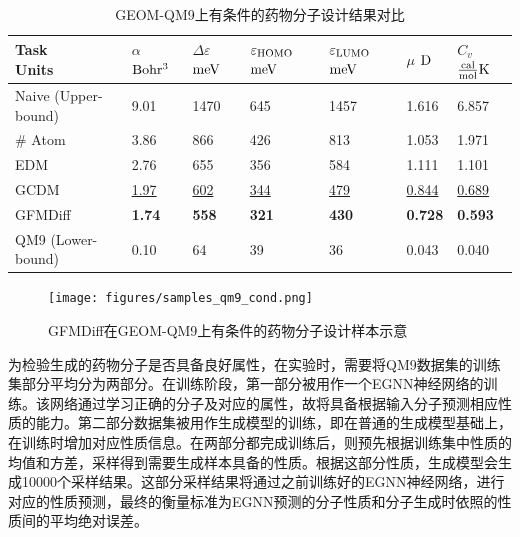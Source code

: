 \begin{table}[h]
    \centering
    \caption{GEOM-QM9上有条件的药物分子设计结果对比}
    \label{tab:gen_qm9_condition}
    \begin{tabular}{lllllll}
    \toprule
    \makecell[l]{Task\\Units} & \makecell[l]{$\alpha$\\${\rm Bohr^3}$} & \makecell[l]{$\Delta \varepsilon$\\${\rm meV}$} & \makecell[l]{$\varepsilon_{{\rm HOMO}}$\\${\rm meV}$} & \makecell[l]{$\varepsilon_{{\rm LUMO}}$\\${\rm meV}$} & \makecell[l]{$\mu$\\${\rm D}$} & \makecell[l]{$C_v$\\$\frac{{\rm cal}}{{\rm mol}}{\rm K}$} \\
    \midrule
    Naive (Upper-bound) & 9.01 & 1470 & 645 & 1457 & 1.616 & 6.857 \\
    \# Atom & 3.86 & 866 & 426 & 813 & 1.053 & 1.971 \\
    EDM & 2.76 & 655 & 356 & 584 & 1.111 & 1.101 \\
    GCDM & \underline{1.97} & \underline{602} & \underline{344} & \underline{479} & \underline{0.844} & \underline{0.689} \\
    GFMDiff & \textbf{1.74} & \textbf{558} & \textbf{321} & \textbf{430} & \textbf{0.728} & \textbf{0.593} \\
    QM9 (Lower-bound) & 0.10 & 64 & 39 & 36 & 0.043 & 0.040 \\
    \bottomrule
    \end{tabular}
\end{table}

\begin{figure}[h]
    \centering
    \texttt{[image: figures/samples\_qm9\_cond.png]}
    \caption{GFMDiff在GEOM-QM9上有条件的药物分子设计样本示意}
    \label{fig:samples_qm9_cond}
\end{figure}

为检验生成的药物分子是否具备良好属性，在实验时，需要将QM9数据集的训练集部分平均分为两部分。在训练阶段，第一部分被用作一个EGNN\cite{egnn_satorras_21}神经网络的训练。该网络通过学习正确的分子及对应的属性，故将具备根据输入分子预测相应性质的能力。第二部分数据集被用作生成模型的训练，即在普通的生成模型基础上，在训练时增加对应性质信息。在两部分都完成训练后，则预先根据训练集中性质的均值和方差，采样得到需要生成样本具备的性质。根据这部分性质，生成模型会生成10000个采样结果。这部分采样结果将通过之前训练好的EGNN神经网络，进行对应的性质预测，最终的衡量标准为EGNN预测的分子性质和分子生成时依照的性质间的平均绝对误差。

